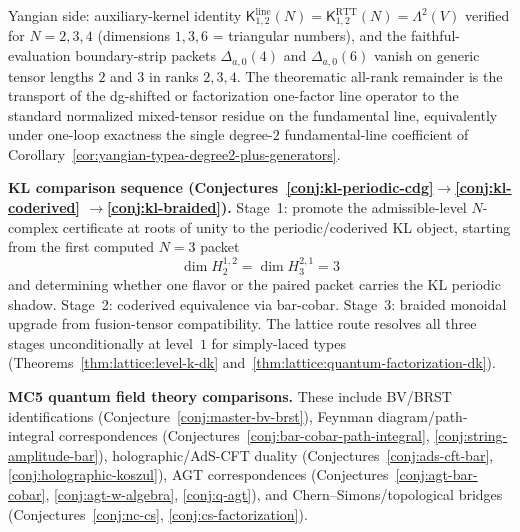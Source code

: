 \begin{remark}
Yangian side: auxiliary-kernel identity
$\mathsf{K}^{\mathrm{line}}_{1,2}(N)
= \mathsf{K}^{\mathrm{RTT}}_{1,2}(N) = \Lambda^2(V)$ verified
for $N = 2, 3, 4$ (dimensions $1, 3, 6$ = triangular numbers), and the
faithful-evaluation boundary-strip packets $\Delta_{a,0}(4)$ and
$\Delta_{a,0}(6)$ vanish on generic tensor lengths $2$ and $3$ in
ranks $2,3,4$.  The theorematic all-rank remainder is the
transport of the dg-shifted or factorization one-factor line operator
to the standard normalized mixed-tensor residue on the fundamental
line, equivalently under one-loop exactness the single degree-$2$
fundamental-line coefficient of
Corollary~\textup{\ref{cor:yangian-typea-degree2-plus-generators}}.

\smallskip\noindent
\textbf{KL comparison sequence
(Conjectures~\ref{conj:kl-periodic-cdg}$\to$\ref{conj:kl-coderived}%
$\to$\ref{conj:kl-braided}).}
Stage~1: promote the admissible-level $N$-complex certificate at roots
of unity to the periodic/coderived KL object, starting from the first
computed $N=3$ packet
\[
\dim H^{1,2}_2
=
\dim H^{2,1}_3
=
3
\]
and determining whether one flavor or the paired packet carries the KL
periodic shadow.
Stage~2: coderived equivalence via bar-cobar.
Stage~3: braided monoidal upgrade from fusion-tensor compatibility.
The lattice route resolves all three stages unconditionally at
level~$1$ for simply-laced types
\textup{(}Theorems~\ref{thm:lattice:level-k-dk}
and~\ref{thm:lattice:quantum-factorization-dk}\textup{)}.

\smallskip\noindent
\textbf{MC5 quantum field theory comparisons.}
These include BV/BRST identifications
\textup{(}Conjecture~\ref{conj:master-bv-brst}\textup{)},
Feynman diagram/path-integral correspondences
\textup{(}Conjectures~\ref{conj:bar-cobar-path-integral},
\ref{conj:string-amplitude-bar}\textup{)},
holographic/AdS-CFT duality
\textup{(}Conjectures~\ref{conj:ads-cft-bar},
\ref{conj:holographic-koszul}\textup{)},
AGT correspondences
\textup{(}Conjectures~\ref{conj:agt-bar-cobar},
\ref{conj:agt-w-algebra}, \ref{conj:q-agt}\textup{)},
and Chern--Simons/topological bridges
\textup{(}Conjectures~\ref{conj:nc-cs},
\ref{conj:cs-factorization}\textup{)}.


\end{remark}
